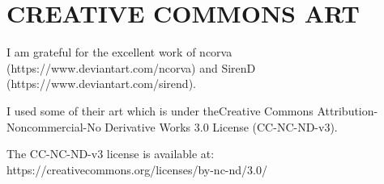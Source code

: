 \onecolumn
\chapter{CREATIVE COMMONS ART}


\noindent I am grateful for the excellent work of ncorva (https://www.deviantart.com/ncorva) and SirenD\\(https://www.deviantart.com/sirend).

\vspace{1em}

\noindent I used some of their art which is under theCreative Commons Attribution-Noncommercial-No Derivative Works 3.0 License (CC-NC-ND-v3).

\vspace{1em}

\noindent The CC-NC-ND-v3 license is available at: https://creativecommons.org/licenses/by-nc-nd/3.0/
